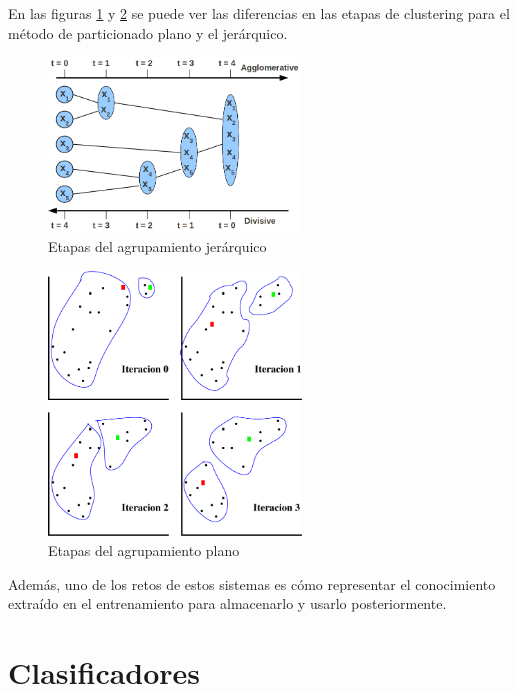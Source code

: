 En las figuras \ref{fig:hier-clustering} y \ref{fig:k-medias} se puede ver las diferencias en las etapas de clustering para el método de particionado plano y el jerárquico.

\begin{figure}[htbp]
\centering
\includegraphics[width=0.6\textwidth]{hierarchical-clustering}
\caption[Etapas del agrupamiento jerárquico]{Etapas del agrupamiento jerárquico \citep{Rai2011}}
\label{fig:hier-clustering}
\end{figure}

\begin{figure}[htbp]
\centering
\includegraphics[width=0.6\textwidth]{k-medias}
\caption[Etapas del agrupamiento plano]{Etapas del agrupamiento plano \citep{RuizReina2013}}
\label{fig:k-medias}
\end{figure}

Además, uno de los retos de estos sistemas es cómo representar el conocimiento extraído en el entrenamiento para almacenarlo y usarlo posteriormente.

\section{Clasificadores}

